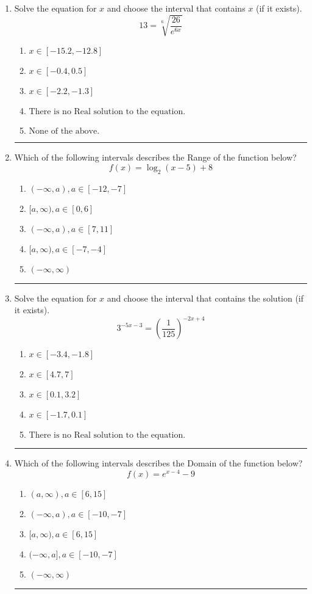 \documentclass[14pt]{extbook}
\newcommand{\litem}[1]{\item#1\hspace*{-1cm}\rule{\textwidth}{0.4pt}}
\begin{document}
\begin{enumerate}
{\begin{enumerate}[label=\Alph*.]
\end{enumerate} }
\litem{
 Solve the equation for $x$ and choose the interval that contains $x$ (if it exists).\[  13 = \sqrt[6]{\frac{26}{e^{6x}}} \]\begin{enumerate}[label=\Alph*.]
\item \( x \in [-15.2, -12.8] \)
\item \( x \in [-0.4, 0.5] \)
\item \( x \in [-2.2, -1.3] \)
\item \( \text{There is no Real solution to the equation.} \)
\item \( \text{None of the above.} \)

\end{enumerate} }
\litem{
Which of the following intervals describes the Range of the function below?\[ f(x) = \log_2{(x-5)}+8 \]\begin{enumerate}[label=\Alph*.]
\item \( (-\infty, a), a \in [-12, -7] \)
\item \( [a, \infty), a \in [0, 6] \)
\item \( (-\infty, a), a \in [7, 11] \)
\item \( [a, \infty), a \in [-7, -4] \)
\item \( (-\infty, \infty) \)

\end{enumerate} }
\litem{
Solve the equation for $x$ and choose the interval that contains the solution (if it exists).\[ 3^{-5x-3} = \left(\frac{1}{125}\right)^{-2x+4} \]\begin{enumerate}[label=\Alph*.]
\item \( x \in [-3.4, -1.8] \)
\item \( x \in [4.7, 7] \)
\item \( x \in [0.1, 3.2] \)
\item \( x \in [-1.7, 0.1] \)
\item \( \text{There is no Real solution to the equation.} \)

\end{enumerate} }
\litem{
Which of the following intervals describes the Domain of the function below?\[ f(x) = e^{x-4}-9 \]\begin{enumerate}[label=\Alph*.]
\item \( (a, \infty), a \in [6, 15] \)
\item \( (-\infty, a), a \in [-10, -7] \)
\item \( [a, \infty), a \in [6, 15] \)
\item \( (-\infty, a], a \in [-10, -7] \)
\item \( (-\infty, \infty) \)


\end{enumerate}}
\end{enumerate}
\end{document}
